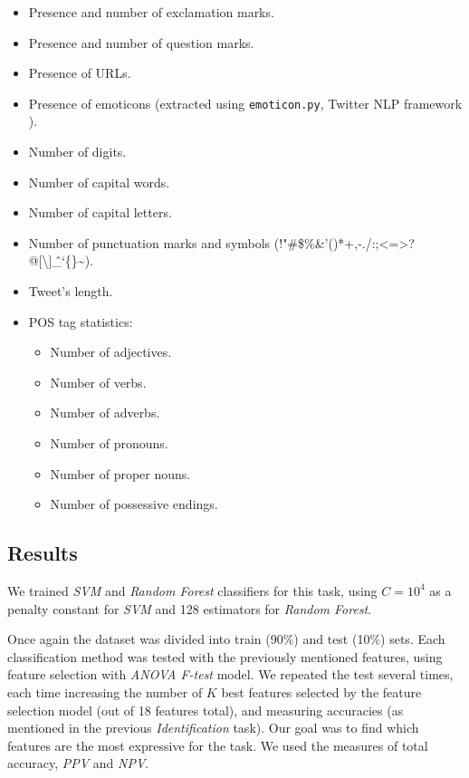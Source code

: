 \documentclass[letterpaper,twocolumn,10pt]{article}
\begin{document}
\begin{itemize}[noitemsep, nolistsep]
	\item Presence and number of exclamation marks.
	\item Presence and number of question marks.
	\item Presence of URLs.
	\item Presence of emoticons (extracted using \texttt{emoticon.py}, Twitter NLP framework \cite{twitter_nlp}).
	\item Number of digits.
	\item Number of capital words.
	\item Number of capital letters.
	\item Number of punctuation marks and symbols (!"\#\$\%\&'()*+,-./:;<=>?@[\textbackslash]\^\_`\{\}\textasciitilde).
	\item Tweet's length.
	\item POS tag statistics:
		\begin{itemize}[noitemsep, nolistsep]
			\item Number of adjectives.
			\item Number of verbs.
			\item Number of adverbs.
			\item Number of pronouns.
			\item Number of proper nouns.
			\item Number of possessive endings.
		\end{itemize}
\end{itemize}

\subsection{Results}
We trained \textit{SVM} and \textit{Random Forest} classifiers for this task, using $ C=10^4 $ as a penalty constant for \textit{SVM} and 128 estimators for \textit{Random Forest}.

Once again the dataset was divided into train (90\%) and test (10\%) sets. Each classification method was tested with the previously mentioned features, using feature selection with \textit{ANOVA F-test} model. We repeated the test several times, each time increasing the number of $K$ best features selected by the feature selection model (out of 18 features total), and measuring accuracies (as mentioned in the previous \textit{Identification} task). Our goal was to find which features are the most expressive for the task. We used the measures of total accuracy, \textit{PPV} and \textit{NPV}.
\end{document}

